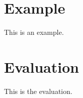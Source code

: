 \documentclass[sigconf,nonacm]{acmart}
\begin{document}

    \section{Example}
        This is an example.

    \section{Evaluation}
        This is the evaluation.
\end{document}
